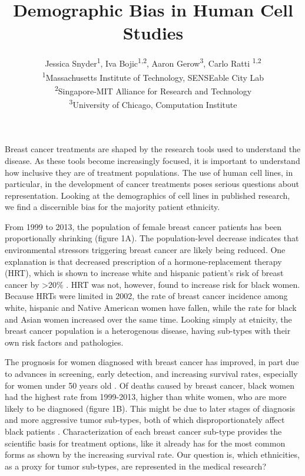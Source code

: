 \documentclass[10pt]{article}
\begin{document}
\title{Demographic Bias in Human Cell Studies }
\author{Jessica Snyder\textsuperscript{1}, Iva Bojic\textsuperscript{1,2}, Aaron Gerow\textsuperscript{3}, Carlo Ratti  \textsuperscript{1,2 } \\ \textsuperscript{1}Massachusetts Institute of Technology, SENSEable City Lab \\ \textsuperscript{2}Singapore-MIT Alliance for Research and Technology \\ \textsuperscript{3}University of Chicago, Computation Institute}

\maketitle

\begin{multicols}{2}
Breast cancer treatments are shaped by the research tools used to understand the disease. As these tools become increasingly focused, it is important to understand how inclusive they are of treatment populations. The use of human cell lines, in particular, in the development of cancer treatments poses serious questions about representation. Looking at the demographics of cell lines in published research, we find a discernible bias for the majority patient ethnicity.

From 1999 to 2013, the population of female breast cancer patients has been proportionally shrinking (figure 1A). The population-level decrease indicates that environmental stressors triggering breast cancer are likely being reduced. One explanation is that decreased prescription of a hormone-replacement therapy (HRT), which is shown to increase white and hispanic patient's risk of breast cancer by >20\% \cite{million2003breast}. HRT was not, however, found to increase risk for black women. Because HRTs were limited in 2002, the rate of breast cancer incidence among white, hispanic and Native American women have fallen, while the rate for black and Asian women increased over the same time. Looking simply at etnicity, the breast cancer population is a heterogenous disease, having sub-types with their own risk factors and pathologies. 

The prognosis for women diagnosed with breast cancer has improved, in part due to advances in screening, early detection, and increasing survival rates, especially for women under 50 years old \cite{etzioni2003case}. Of deaths caused by breast cancer, black women had the highest rate from 1999-2013, higher than white women, who are more likely to be diagnosed (figure 1B). This might be due to later stages of diagnosis and more aggressive tumor sub-types, both of which disproportionately affect black patients \cite{batina2013variation}. Characterization of each breast cancer sub-type provides the scientific basis for treatment options, like it already has for the most common forms as shown by the increasing survival rate. Our question is, which ethnicities, as a proxy for tumor sub-types, are represented in the medical research?%


\end{multicols}
\end{document}
